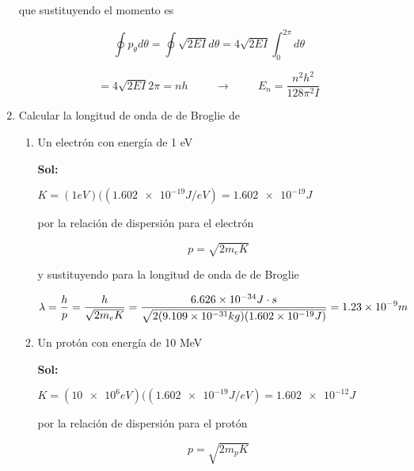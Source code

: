 \documentclass[12pt,a4paper]{article}
\begin{document}
\begin{enumerate}
    que sustituyendo el momento es
    
    \begin{equation*}
        \oint p_\theta d \theta =\oint \sqrt{2EI}  d \theta = 4\sqrt{2EI} \int_{0}^{2\pi} d\theta
    \end{equation*}
    
    \begin{equation*}
        = 4\sqrt{2EI} 2\pi =nh \hspace{1cm} \rightarrow \hspace{1cm} E_n= \frac{n^2 h^2}{128\pi ^2I}
    \end{equation*}
    
    
    
    
    
    
    \item Calcular la longitud de onda de de Broglie de
    
    \begin{enumerate}
        \item Un electrón con energía de 1 eV
        
        \textbf{Sol:}
        
        $K = (1 eV)((\num{1.602 e-19} J/eV)=\num{1.602 e-19} J$
        
        por la relación de dispersión para el electrón 
        
        \begin{equation*}
            p= \sqrt{2 m_e K}
        \end{equation*}
        
        y sustituyendo para la longitud de onda de de Broglie
        
        \begin{equation*}
            \lambda = \frac{h}{p} = \frac{h}{\sqrt{2 m_e K}} = \frac{\num{6.626 e -34}J\cdot s}{\sqrt{2(\num{9.109 e-31}kg)(\num{1.602 e-19} J)}} = \num{1.23e-9}m
        \end{equation*}
        
        
        
        \item Un protón con energía de 10 MeV
        
        \textbf{Sol:}
        
        $K = (\num{10e6} eV)((\num{1.602 e-19} J/eV)=\num{1.602 e-12} J$
        
        por la relación de dispersión para el protón
        
        \begin{equation*}
            p= \sqrt{2 m_p K}
        \end{equation*}
        

\end{enumerate}
\end{enumerate}
\end{document}

